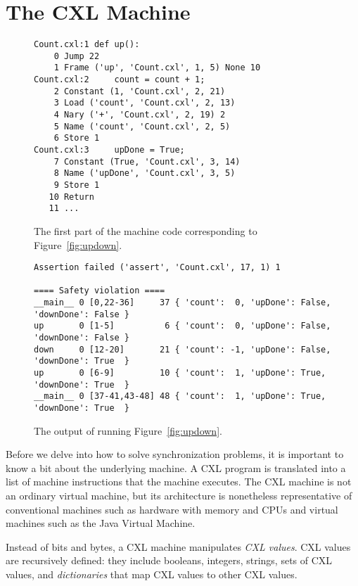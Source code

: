 \documentclass{book}
\newenvironment{code}{
\tcolorbox
}{
\endtcolorbox
}
\begin{document}
\chapter{The CXL Machine}

\begin{figure}
\begin{code}
\begin{verbatim}
Count.cxl:1 def up():
    0 Jump 22
    1 Frame ('up', 'Count.cxl', 1, 5) None 10
Count.cxl:2     count = count + 1;
    2 Constant (1, 'Count.cxl', 2, 21)
    3 Load ('count', 'Count.cxl', 2, 13)
    4 Nary ('+', 'Count.cxl', 2, 19) 2
    5 Name ('count', 'Count.cxl', 2, 5)
    6 Store 1
Count.cxl:3     upDone = True;
    7 Constant (True, 'Count.cxl', 3, 14)
    8 Name ('upDone', 'Count.cxl', 3, 5)
    9 Store 1
   10 Return
   11 ...
\end{verbatim}
\end{code}
\caption{The first part of the machine code corresponding to Figure~\ref{fig:updown}.}
\label{fig:updowncode}
\end{figure}

\begin{figure}
\begin{code}
\begin{verbatim}
Assertion failed ('assert', 'Count.cxl', 17, 1) 1

==== Safety violation ====
__main__ 0 [0,22-36]     37 { 'count':  0, 'upDone': False, 'downDone': False }
up       0 [1-5]          6 { 'count':  0, 'upDone': False, 'downDone': False }
down     0 [12-20]       21 { 'count': -1, 'upDone': False, 'downDone': True  }
up       0 [6-9]         10 { 'count':  1, 'upDone': True,  'downDone': True  }
__main__ 0 [37-41,43-48] 48 { 'count':  1, 'upDone': True,  'downDone': True  }
\end{verbatim}
\end{code}
\caption{The output of running Figure~\ref{fig:updown}.}
\label{fig:updownoutput}
\end{figure}

Before we delve into how to solve synchronization problems, it is important
to know a bit about the underlying machine.  A CXL program is translated
into a list of machine instructions that the machine executes.
The CXL machine is not an ordinary virtual machine, but its architecture
is nonetheless representative of conventional machines such as hardware
with memory and CPUs and virtual machines such as the Java Virtual Machine.

Instead of bits and bytes, a CXL machine manipulates \emph{CXL values}.
CXL values are recursively defined: they include booleans, integers, strings,
sets of CXL values, and \emph{dictionaries} that map CXL values to other CXL
values.
\end{document}
